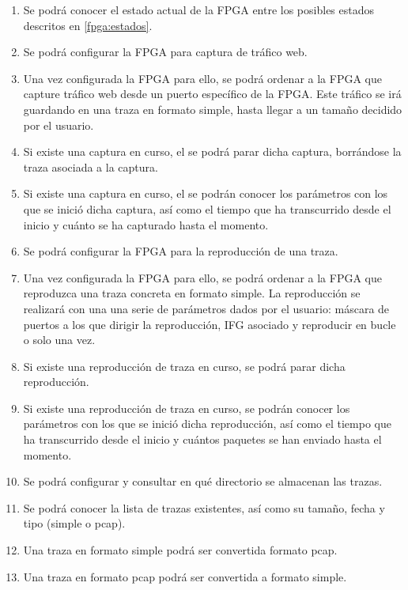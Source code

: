 \begin{enumerate}[before=\itshape,font=\normalfont,label=\bfseries RF. \arabic*]
  \setlength{\itemsep}{10pt}
  \setlength{\parskip}{10pt}
  \setlength{\parsep}{10pt}
  \item Se podrá conocer el estado actual de la \gls{FPGA} entre los posibles estados descritos en \ref{fpga:estados}.
  \item Se podrá configurar la \gls{FPGA} para captura de tráfico web.
  \item Una vez configurada la \gls{FPGA} para ello, se podrá ordenar a la \gls{FPGA} que capture tráfico web desde un puerto específico de la \gls{FPGA}. Este tráfico se irá guardando en una \gls{traza} en formato \gls{simple}, hasta llegar a un tamaño decidido por el usuario.
  \item Si existe una captura en curso, el se podrá parar dicha captura, borrándose la \gls{traza} asociada a la captura.
  \item Si existe una captura en curso, el se podrán conocer los parámetros con los que se inició dicha captura, así como el tiempo que ha transcurrido desde el inicio y cuánto se ha capturado hasta el momento.
  \item Se podrá configurar la \gls{FPGA} para la reproducción de una \gls{traza}.
  \item Una vez configurada la \gls{FPGA} para ello, se podrá ordenar a la \gls{FPGA} que reproduzca una \gls{traza} concreta en formato \gls{simple}. La reproducción se realizará con una una serie de parámetros dados por el usuario: máscara de puertos a los que dirigir la reproducción, \gls{IFG} asociado y reproducir en bucle o solo una vez.
  \item Si existe una reproducción de \gls{traza} en curso, se podrá parar dicha reproducción.
  \item Si existe una reproducción de \gls{traza} en curso, se podrán conocer los parámetros con los que se inició dicha reproducción, así como el tiempo que ha transcurrido desde el inicio y cuántos paquetes se han enviado hasta el momento.
  \item Se podrá configurar y consultar en qué directorio se almacenan las \glspl{traza}.
  \item Se podrá conocer la lista de \glspl{traza} existentes, así como su tamaño, fecha y tipo (\gls{simple} o \gls{pcap}).
  \item Una traza en formato \gls{simple} podrá ser convertida formato \gls{pcap}.
  \item Una traza en formato \gls{pcap} podrá ser convertida a formato \gls{simple}.

\end{enumerate}
